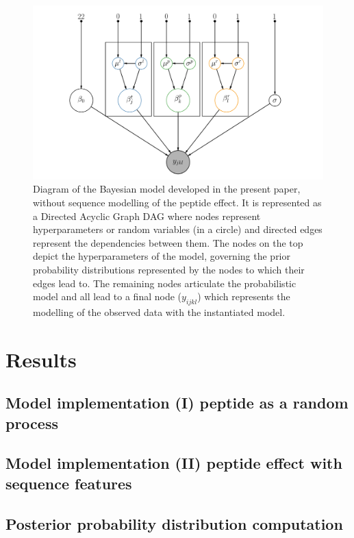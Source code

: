 \documentclass[11pt, a4paper]{report}
\begin{document}
\begin{figure}[!h]
\centering
\includegraphics[width=\textwidth]{graph}
\caption{Diagram of the Bayesian model developed in the present paper, without sequence modelling of the peptide effect. It is represented as a Directed Acyclic Graph \ac{DAG} where nodes represent hyperparameters or random variables (in a circle) and directed edges  represent the dependencies between them. The nodes on the top depict the hyperparameters of the model, governing the prior probability distributions represented by the nodes to which their edges lead to. The remaining nodes articulate the probabilistic model and all lead to a final node ($y_{ijkl}$) which represents the modelling of the observed data with the instantiated model.}
\label{fig:daft_model}
\end{figure}



\section{Results}

\subsection{Model implementation (I) peptide as a random process}

\subsection{Model implementation (II) peptide effect with sequence features}

\subsection{Posterior probability distribution computation}
\end{document}
